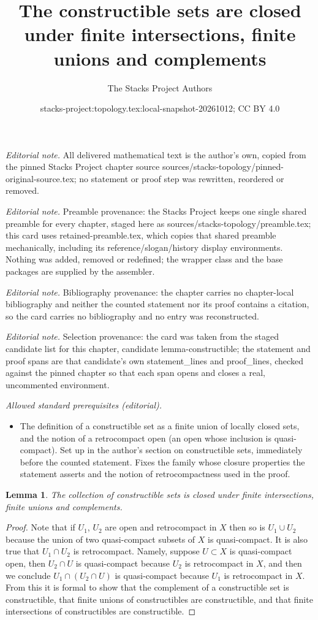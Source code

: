 \documentclass[10pt,a4paper]{amsart}
\title{The constructible sets are closed under finite intersections, finite unions and complements}
\author{The Stacks Project Authors}
\date{stacks-project:topology.tex:local-snapshot-20261012; CC BY 4.0}
\theoremstyle{plain}
\newtheorem{lemma}[subsection]{Lemma}
\theoremstyle{definition}
\theoremstyle{remark}
\numberwithin{equation}{subsection}
\begin{document}
\maketitle
\noindent\textit{Editorial note.} All delivered mathematical text is the author's own, copied from the pinned Stacks Project chapter source sources/stacks-topology/pinned-original-source.tex; no statement or proof step was rewritten, reordered or removed.\par\medskip
\noindent\textit{Editorial note.} Preamble provenance: the Stacks Project keeps one single shared preamble for every chapter, staged here as sources/stacks-topology/preamble.tex; this card uses retained-preamble.tex, which copies that shared preamble mechanically, including its reference/slogan/history display environments. Nothing was added, removed or redefined; the wrapper class and the base packages are supplied by the assembler.\par\medskip
\noindent\textit{Editorial note.} Bibliography provenance: the chapter carries no chapter-local bibliography and neither the counted statement nor its proof contains a citation, so the card carries no bibliography and no entry was reconstructed.\par\medskip
\noindent\textit{Editorial note.} Selection provenance: the card was taken from the staged candidate list for this chapter, candidate lemma-constructible; the statement and proof spans are that candidate's own statement\_lines and proof\_lines, checked against the pinned chapter so that each span opens and closes a real, uncommented environment.\par\medskip
\noindent\textit{Allowed standard prerequisites (editorial).}\begin{itemize}
\item The definition of a constructible set as a finite union of locally closed sets, and the notion of a retrocompact open (an open whose inclusion is quasi-compact). Set up in the author's section on constructible sets, immediately before the counted statement. Fixes the family whose closure properties the statement asserts and the notion of retrocompactness used in the proof.
\end{itemize}\medskip
\begin{lemma}
\label{lemma-constructible}
The collection of constructible sets is closed under
finite intersections, finite unions and complements.
\end{lemma}

\begin{proof}
Note that if $U_1$, $U_2$ are open and retrocompact in $X$
then so is $U_1 \cup U_2$ because the union of two quasi-compact
subsets of $X$ is quasi-compact. It is also true that
$U_1 \cap U_2$ is retrocompact. Namely, suppose $U \subset X$
is quasi-compact open, then $U_2 \cap U$ is quasi-compact because
$U_2$ is retrocompact in $X$, and then we conclude
$U_1 \cap (U_2 \cap U)$ is quasi-compact because $U_1$ is
retrocompact in $X$. From this it is formal to show that
the complement of a constructible set is constructible,
that finite unions of constructibles are constructible, and
that finite intersections of constructibles are constructible.
\end{proof}
\end{document}
